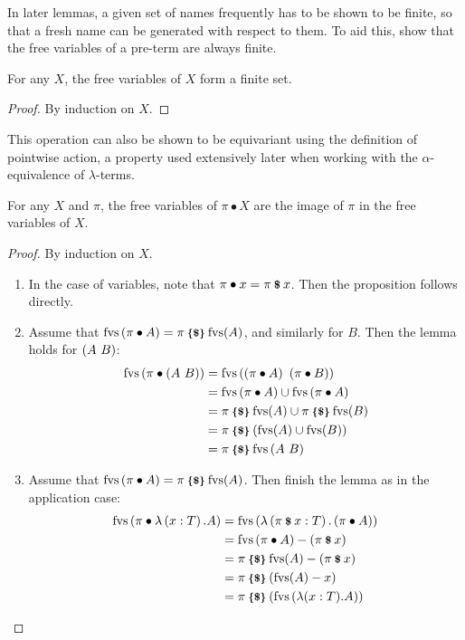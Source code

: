 In later lemmas, a given set of names frequently has to be shown to be finite, so that a fresh name can be generated with respect to them.
To aid this, show that the free variables of a pre-term are always finite.
\begin{lemma}
For any \(X\), the free variables of \(X\) form a finite set.
\end{lemma}
\begin{proof}
By induction on \(X\).
\end{proof}

This operation can also be shown to be equivariant using the definition of pointwise action, a property used extensively later when working with the \(\alpha\)-equivalence of \(\lambda\)-terms.

\begin{lemma}
For any \(X\) and \(\pi\), the free variables of \(\pi \bullet X\) are the image of \(\pi\) in the free variables of \(X\).
\end{lemma}
\begin{proof}
By induction on \(X\).
\begin{enumerate}
\item
In the case of variables, note that \(\pi \bullet x = \pi \mathbin{\textrm{\footnotesize{\textbf{\$}}}} x\).
Then the proposition follows directly.
\item
Assume that \(\mathrm{fvs}\left(\pi \bullet A\right) = \pi \mathbin{\textrm{\footnotesize{\textbf{\{\$\}}}}} \mathrm{fvs}(A)\), and similarly for \(B\).
Then the lemma holds for \(\left(A\ B\right)\):
\begin{align*}
\mathrm{fvs}\left(\pi \bullet \left(A\ B\right)\right)
&= \mathrm{fvs}\left(\left(\pi \bullet A\right)\ \left(\pi \bullet B\right)\right)\\
&= \mathrm{fvs}\left(\pi \bullet A\right) \cup \mathrm{fvs}\left(\pi \bullet A\right)\\
&= \pi \mathbin{\textrm{\footnotesize{\textbf{\{\$\}}}}} \mathrm{fvs}(A) \cup \pi \mathbin{\textrm{\footnotesize{\textbf{\{\$\}}}}} \mathrm{fvs}(B)\\
&= \pi \mathbin{\textrm{\footnotesize{\textbf{\{\$\}}}}} \left(\mathrm{fvs}(A) \cup \mathrm{fvs}(B)\right)\\
&= \pi \mathbin{\textrm{\footnotesize{\textbf{\{\$\}}}}} \mathrm{fvs}\left(A\ B\right)
\end{align*}
\item
Assume that \(\mathrm{fvs}\left(\pi \bullet A\right) = \pi \mathbin{\textrm{\footnotesize{\textbf{\{\$\}}}}} \mathrm{fvs}(A)\).
Then finish the lemma as in the application case:
\begin{align*}
\mathrm{fvs}\left(\pi \bullet \lambda \left(x:T\right).A\right) 
&= \mathrm{fvs}\left(\lambda \left(\pi \mathbin{\textrm{\footnotesize{\textbf{\$}}}} x : T\right). \left(\pi \bullet A\right)\right)\\
&= \mathrm{fvs}\left(\pi \bullet A\right) - \left(\pi \mathbin{\textrm{\footnotesize{\textbf{\$}}}} x\right)\\
&= \pi \mathbin{\textrm{\footnotesize{\textbf{\{\$\}}}}} \mathrm{fvs}(A) - \left(\pi \mathbin{\textrm{\footnotesize{\textbf{\$}}}} x\right)\\
&= \pi \mathbin{\textrm{\footnotesize{\textbf{\{\$\}}}}} \left(\mathrm{fvs}(A) - x\right)\\
&= \pi \mathbin{\textrm{\footnotesize{\textbf{\{\$\}}}}} \left(\mathrm{fvs}\left(\lambda (x:T).A\right)\right)
\end{align*}
\end{enumerate}
\end{proof}

